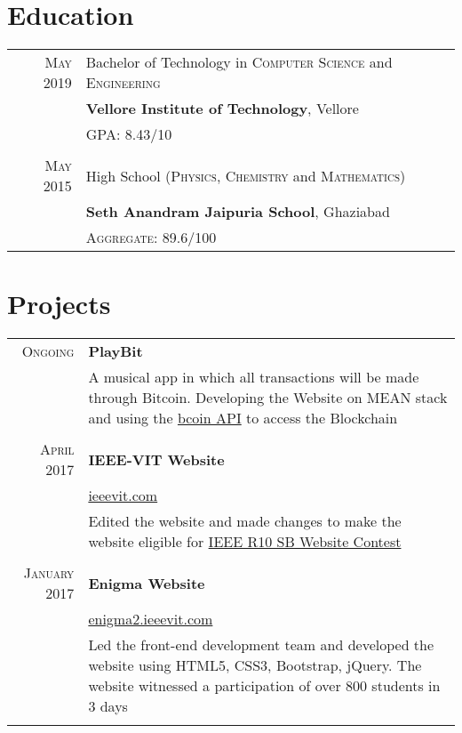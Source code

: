 \documentclass[a4paper,1pt]{article}
\begin{document}
\section{Education}
\begin{tabular}{rl}	
 \textsc{May} 2019 & Bachelor of Technology in \textsc{Computer Science} and \textsc{Engineering}\\& \textbf{Vellore Institute of Technology}, Vellore\\&
 \normalsize \textsc{GPA}: 8.43/10\\&\\
\textsc{May} 2015& High School (\textsc{Physics}, \textsc{Chemistry} and \textsc{Mathematics})\\&
\normalsize\textbf{Seth Anandram Jaipuria School}, Ghaziabad
\\&\normalsize \textsc{Aggregate}: 89.6/100\\
\end{tabular}

\section{Projects}
\begin{tabular}{r|p{11cm}}

\textsc{Ongoing} & \textbf{PlayBit} \\&\footnotesize{A musical app in which all transactions will be made through Bitcoin. Developing the Website on MEAN stack and using the \href{http://bcoin.io/}{bcoin API} to access the Blockchain}\\\multicolumn{2}{c}{}\\
\textsc{April 2017} & \textbf{IEEE-VIT Website} \\&\href{https://ieeevit.com}{ieeevit.com}\\&\footnotesize{Edited the website and made changes to make the website eligible for \href{http://sac.ieeer10.org/website-contest/}{IEEE R10 SB Website Contest}}\\\multicolumn{2}{c}{} \\
 \textsc{January 2017} & \textbf{Enigma Website} \\&\href{http://enigma2.ieeevit.com/}{enigma2.ieeevit.com}\\&\footnotesize{Led the front-end development team and developed the website using HTML5, CSS3, Bootstrap, jQuery. The website witnessed a participation of over 800 students in 3 days}\\\multicolumn{2}{c}{} 

\end{tabular}
\end{document}
